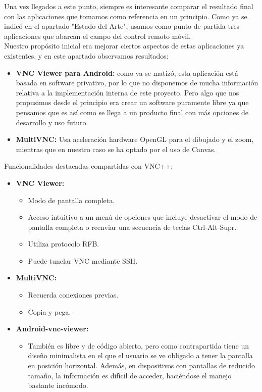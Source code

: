 Una vez llegados a este punto, siempre es interesante comparar el resultado final con las aplicaciones que tomamos como referencia en un principio. Como ya se indicó en el apartado "Estado del Arte", usamos como punto de partida tres aplicaciones que abarcan el campo del control remoto móvil.\\

Nuestro propósito inicial era mejorar ciertos aspectos de estas aplicaciones ya existentes, y en este apartado observamos resultados:
\begin{itemize}
\item \textbf{VNC Viewer para Android:} como ya se matizó, esta aplicación está basada en software privativo, por lo que no disponemos de mucha información relativa a la implementación interna de este proyecto. Pero algo que nos propusimos desde el principio era crear un software puramente libre ya que pensamos que es así como se llega a un producto final con más opciones de desarrollo y uso futuro.
\item \textbf{MultiVNC:} Usa aceleración hardware OpenGL para el dibujado y el zoom, mientras que en nuestro caso se ha optado por el uso de Canvas.
\end{itemize}

Funcionalidades destacadas compartidas con VNC++:
\begin{itemize}
\item \textbf{VNC Viewer:}
\begin{itemize}
\item Modo de pantalla completa.
\item Acceso intuitivo a un menú de opciones que incluye desactivar el modo de pantalla completa o reenviar una secuencia de teclas Ctrl-Alt-Supr.
\item Utiliza protocolo RFB.
\item Puede tunelar VNC mediante SSH.
\end{itemize}
\item \textbf{MultiVNC:}
\begin{itemize}
\item Recuerda conexiones previas.
\item Copia y pega.
\end{itemize}
\item \textbf{Android-vnc-viewer:}
\begin{itemize}
\item También es libre y de código abierto, pero como contrapartida tiene un diseño minimalista en el que el usuario se ve obligado a tener la pantalla en posición horizontal. Además, en dispositivos con pantallas de reducido tamaño, la información es difícil de acceder, haciéndose el manejo bastante incómodo.
\end{itemize}
\end{itemize}

